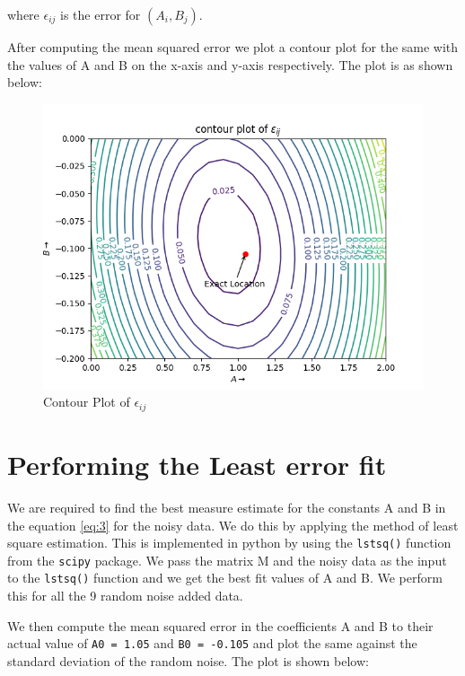 \documentclass[11pt, a4paper]{article}
\begin{document}
where $\epsilon_{ij}$ is the error for $(A_i,B_j)$.

After computing the mean squared error we plot a contour plot for the same with the values of A and B on the x-axis and y-axis respectively. The plot is as shown below:

\begin{figure}[!tbh]
   	\centering
   	\includegraphics[scale=0.5]{figure2.png}  
   	\caption{Contour Plot of $\epsilon_{ij}$}
   	\label{fig:fig3}
   \end{figure} 
   
   
\section{Performing the Least error fit}

We are required to find the best measure estimate for the constants A and B in the equation \eqref{eq:3} for the noisy data. We do this by applying the method of least square estimation. This is implemented in python by using the \texttt{lstsq()} function from the \texttt{scipy} package. We pass the matrix M and the noisy data as the input to the \texttt{lstsq()} function and we get the best fit values of A and B. We perform this for all the 9 random noise added data.
\newline

We then compute the mean squared error in the coefficients A and B to their actual value of \texttt{A0 = 1.05} and \texttt{B0 = -0.105} and plot the same  against the standard deviation of the random noise. The plot is shown below:
\end{document}
